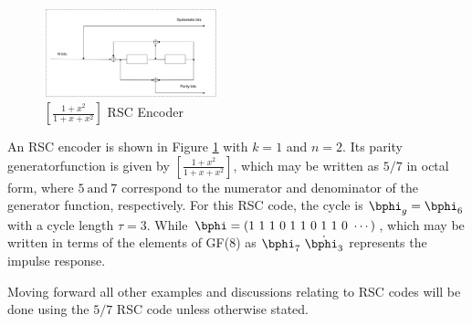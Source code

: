 \begin{figure}[h]
\centering
		\includegraphics[width=0.45\textwidth]{./PaperSources/RSCExample3.pdf}
		\caption{$[\frac{1+x^2}{1+x+x^2}]$  RSC Encoder}
		\label{fig1}
		\end{figure}

\begin{example}		
An RSC encoder is shown in Figure \ref{fig1} with $k=1$ and $n=2$. Its parity generator\newline function is given by $[\frac{1+x^2}{1+x+x^2}]$, which may be written as $5/7$ in octal form, where $5 ~ \text{and} ~ 7$ correspond to the numerator and denominator of the generator function, respectively. 
 For this RSC code, the cycle is $\bphi_g=\bphi_6 $ with a cycle length $\tau =3$. While $\bphi=(1~1~1~ 0~ 1~ 1~ 0~ 1~ 1~ 0~\cdots)$, which may be written in terms of the elements of GF(8) as $\bphi_7~\dot{\bphi_3}$ represents the impulse response. 
 \end{example}
  Moving forward all other examples and discussions relating to RSC codes will be done using the $5/7$ RSC code unless otherwise stated.

